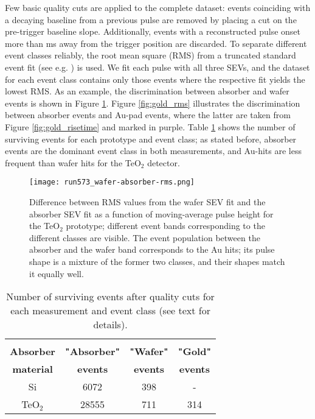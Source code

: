 \documentclass[superscriptaddress,nofootinbib ]{revtex4-2}
\begin{document}
Few basic quality cuts are applied to the complete dataset:  events coinciding with a decaying baseline from a previous pulse are removed by placing a cut on the pre-trigger baseline slope. Additionally, events with a reconstructed pulse onset more than \unit[1]{ms} away from the trigger position are discarded. To separate different event classes reliably, the root mean square (RMS) from a truncated standard event fit (see e.g. \cite{angloher_results_2017}) is used. We fit each pulse with all three SEVs, and the dataset for each event class contains only those events where the respective fit yields the lowest RMS. As an example, the discrimination between absorber and wafer events is shown in Figure \ref{fig:RMSDiff}. Figure \ref{fig:gold_rms} illustrates the discrimination between absorber events and Au-pad events, where the latter are taken from Figure \ref{fig:gold_risetime} and marked in purple. Table \ref{tab:event_rates} shows the number of surviving events for each prototype and event class; as stated before, absorber events are the dominant event class in both measurements, and Au-hits are less frequent than wafer hits for the TeO$_{2}$ detector.

\begin{figure}[!htb]
\centering
\texttt{[image: run573\_wafer-absorber-rms.png]}
\caption{Difference between RMS values from the wafer SEV fit and the absorber SEV fit as a function of moving-average pulse height for the TeO$_2$ prototype; different event bands corresponding to the different classes are visible. The event population between the absorber and the wafer band corresponds to the Au hits; its pulse shape is a mixture of the former two classes, and their shapes match it equally well.}
\label{fig:RMSDiff}
\end{figure}

\begingroup
\setlength{\tabcolsep}{8pt}
\renewcommand{\arraystretch}{1.2}
\begin{table}
   \centering
    \begin{tabular}{c c c c} 
        \multicolumn{4}{c}{}\\
 \textbf{Absorber} & \textbf{"Absorber"} & \textbf{"Wafer"}  & \textbf{"Gold"}\\
                     \textbf{material} 	& \textbf{events} & \textbf{events}  & \textbf{events} \\
                    \hline
                      Si                 & 6072            &  398      &  -   \\
                      TeO$_2$            & 28555            &  711      &  314   \\
            \hline
    \end{tabular}
    \caption{Number of surviving events after quality cuts for each measurement and event class (see text for details).}
    \label{tab:event_rates}
\end{table}
\endgroup
\end{document}
